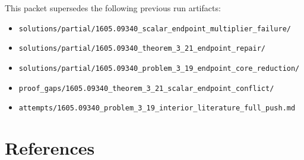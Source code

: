 \documentclass[11pt]{article}
\begin{document}
This packet supersedes the following previous run artifacts:
\begin{itemize}
\item \texttt{solutions/partial/1605.09340\_scalar\_endpoint\_multiplier\_failure/}
\item \texttt{solutions/partial/1605.09340\_theorem\_3\_21\_endpoint\_repair/}
\item \texttt{solutions/partial/1605.09340\_problem\_3\_19\_endpoint\_core\_reduction/}
\item \texttt{proof\_gaps/1605.09340\_theorem\_3\_21\_scalar\_endpoint\_conflict/}
\item \texttt{attempts/1605.09340\_problem\_3\_19\_interior\_literature\_full\_push.md}
\end{itemize}

\section*{References}
\end{document}
